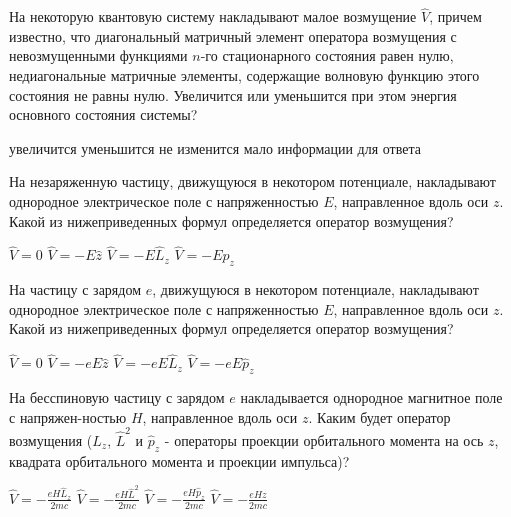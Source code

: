 \documentclass[11pt,a4paper]{exam}
\begin{document}
\begin{questions}
\question На некоторую квантовую систему накладывают малое возмущение $\hat V$, причем известно, что диагональный матричный элемент оператора возмущения с невозмущенными функциями $n$-го стационарного состояния равен нулю, недиагональные матричные элементы, содержащие волновую функцию этого состояния не равны нулю. Увеличится или уменьшится при этом энергия основного состояния системы? 
\begin{choices}
\choice увеличится  
\choice уменьшится  
\choice не изменится   
\choice мало информации для ответа
\end{choices}

\question На незаряженную частицу, движущуюся в некотором потенциале, накладывают однородное электрическое поле с напряженностью $E$, направленное вдоль оси $z$. Какой из нижеприведенных формул определяется оператор возмущения?
\begin{choices}
\choice $\hat V = 0$      
\choice $\hat V =  - E\hat z$      
\choice $\hat V =  - E{\hat L_z}$     
\choice $\hat V =  - E{\hat p_z}$
\end{choices}

\question На частицу с зарядом $e$, движущуюся в некотором потенциале, накладывают однородное электрическое поле с напряженностью $E$, направленное вдоль оси $z$. Какой из нижеприведенных формул определяется оператор возмущения?
\begin{choices}
\choice $\hat V = 0$      
\choice $\hat V =  - eE\hat z$     
\choice $\hat V =  - eE{\hat L_z}$    
\choice $\hat V =  - eE{\hat p_z}$
\end{choices}

\question На бесспиновую частицу с зарядом $e$ накладывается однородное магнитное поле с напряжен-ностью $H$, направленное вдоль оси $z$. Каким будет оператор возмущения (${\hat L_z}$, ${\hat L^2}$ и ${\hat p_z}$ - операторы проекции орбитального момента на ось $z$, квадрата орбитального момента и проекции импульса)?
\begin{choices}
\choice $\hat V =  - \frac{{eH{{\hat L}_z}}}{{2mc}}$ 
\choice $\hat V =  - \frac{{eH{{\hat L}^2}}}{{2mc}}$    
\choice $\hat V =  - \frac{{eH{{\hat p}_z}}}{{2mc}}$ 
\choice $\hat V =  - \frac{{eHz}}{{2mc}}$
\end{choices}


\end{questions}
\end{document}
